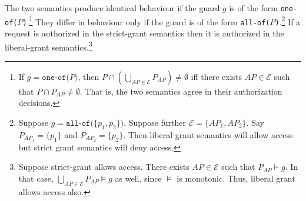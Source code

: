 \documentclass{acm_proc_article-sp}
\newcommand{\textcode}[1]{\texttt{#1}}
\begin{document}
The two semantics produce identical behaviour if the guard $g$ is of
the form \textcode{one-of($P$)}.\footnote{If $g =
  \textcode{one-of(}P\textcode{)}$, then $P \cap (\bigcup_{\mathit{AP}
    \in \mathcal{E}} P_\mathit{AP} ) \neq \emptyset$ iff there exists
  $\mathit{AP} \in \mathcal{E}$ such that $P \cap P_\mathit{AP} \neq
  \emptyset$.  That is, the two semantics agree in their authorization
  decisions.} They differ in behaviour only if the guard is of the
form \textcode{all-of($P$)}.\footnote{ Suppose $g =
  \textcode{all-of(}\{p_1, p_2\}\textcode{)}$.  Suppose further
  $\mathcal{E} = \{ \mathit{AP}_1, \mathit{AP}_2 \}$.  Say
  $P_{\mathit{AP}_1} = \{ p_1 \}$ and $P_{\mathit{AP}_2} = \{ p_2
  \}$. Then liberal grant semantics will allow access but strict grant
  semantics will deny access.  }  If a request is authorized in the
strict-grant semantics then it is authorized in the liberal-grant
semantics.\footnote{ Suppose strict-grant allows access. There exists
  $\mathit{AP} \in \mathcal{E}$ such that $P_\mathit{AP} \models g$.
  In that case, $\bigcup_{\mathit{AP} \in \mathcal{E}} P_\mathit{AP}
  \models g$ as well, since $\models$ is monotonic.  Thus, liberal
  grant allows access also.}
\end{document}
